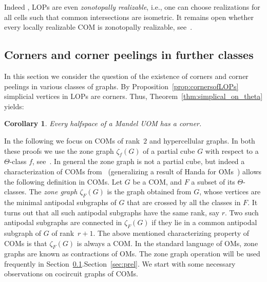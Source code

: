 \documentclass[final,11pt]{article}
\newtheorem{cor}[thm]{Corollary}%
\begin{document}
Indeed , LOPs are even \emph{zonotopally realizable}, i.e., one can choose realizations for all cells such that common intersections are isometric.
It remains open whether every locally realizable COM is zonotopally realizable, see~\cite[Question 1]{Ban-18}. 

\subsection{Corners and corner peelings in further classes}\label{sec:corners}

In this section we consider the question of the existence of corners and corner peelings in various classes of graphs. By Proposition~\ref{prop:cornersofLOPs} simplicial vertices in LOPs are corners. Thus, Theorem~\ref{thm:simplical_on_theta} yields:

\begin{cor}\label{cor:AOMcorner}
Every halfspace of a Mandel UOM  has a corner.
\end{cor}

In the following we focus on COMs of rank~$2$ and hypercellular graphs. In both these proofs we use the zone graph $\zeta_f(G)$ of a partial cube $G$ with respect to a $\Theta$-class $f$, see~\cite{Kla-12}. In general the zone graph is not a partial cube, but indeed a characterization of COMs from~\cite{Kna-17} (generalizing a result of Handa for OMs~\cite{ha-90}) allows the following definition in COMs. Let $G$ be a COM, and $F$ a subset of its $\Theta$-classes. The \emph{zone graph} $\zeta_F(G)$ is the graph obtained from $G$, whose vertices are the minimal antipodal subgraphs of $G$ that are crossed by all the classes in $F$. It turns out that all such antipodal subgraphs have the same rank, say $r$. Two such antipodal subgraphs are connected in $\zeta_F(G)$ if they lie in a common antipodal subgraph of $G$ of rank~$r+1$. The above mentioned characterizing property of COMs is that $\zeta_F(G)$ is always a COM. In the standard language of OMs, zone graphs are known as contractions of OMs. The zone graph operation will be used frequently in Section~\ref{sec:corners}.Section~\ref{sec:prel}. We start with some necessary observations on cocircuit graphs of COMs.



% 
% 
\end{document}
